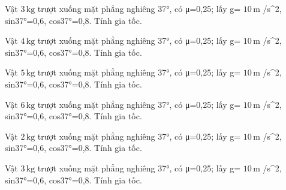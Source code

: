 \begin{ex}
Vật $3\,\text{kg}$ trượt xuống mặt phẳng nghiêng 37°, có μ=0,25; lấy g= $10\,\text{m}$ /s^2, sin37°=0,6, cos37°=0,8. Tính gia tốc.
\end{ex}

\begin{ex}
Vật $4\,\text{kg}$ trượt xuống mặt phẳng nghiêng 37°, có μ=0,25; lấy g= $10\,\text{m}$ /s^2, sin37°=0,6, cos37°=0,8. Tính gia tốc.
\end{ex}

\begin{ex}
Vật $5\,\text{kg}$ trượt xuống mặt phẳng nghiêng 37°, có μ=0,25; lấy g= $10\,\text{m}$ /s^2, sin37°=0,6, cos37°=0,8. Tính gia tốc.
\end{ex}

\begin{ex}
Vật $6\,\text{kg}$ trượt xuống mặt phẳng nghiêng 37°, có μ=0,25; lấy g= $10\,\text{m}$ /s^2, sin37°=0,6, cos37°=0,8. Tính gia tốc.
\end{ex}

\begin{ex}
Vật $2\,\text{kg}$ trượt xuống mặt phẳng nghiêng 37°, có μ=0,25; lấy g= $10\,\text{m}$ /s^2, sin37°=0,6, cos37°=0,8. Tính gia tốc.
\end{ex}

\begin{ex}
Vật $3\,\text{kg}$ trượt xuống mặt phẳng nghiêng 37°, có μ=0,25; lấy g= $10\,\text{m}$ /s^2, sin37°=0,6, cos37°=0,8. Tính gia tốc.
\end{ex}

